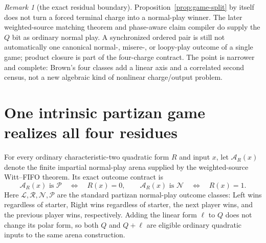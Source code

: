 \documentclass[11pt]{article}
\theoremstyle{definition}
\theoremstyle{remark}
\newtheorem{remark}[theorem]{Remark}
\begin{document}
\begin{remark}[the exact residual boundary]
Proposition~\ref{prop:game-split} by itself does not turn a forced
terminal charge into a normal-play winner.  The later weighted-source matching
theorem and phase-aware claim compiler do supply the $Q$ bit as ordinary normal
play.  A synchronized ordered pair is still not automatically one canonical
normal-, misere-, or loopy-play outcome of a single game; product closure is
part of the four-charge contract.  The point is narrower and complete:
Brown's four classes add a linear axis and a correlated second census, not a
new algebraic kind of nonlinear charge/output problem.
\end{remark}

\section{One intrinsic partizan game realizes all four residues}

For every ordinary characteristic-two quadratic form $R$ and input $x$, let
$\mathcal A_R(x)$ denote the finite impartial normal-play arena supplied by
the weighted-source Witt--FIFO theorem.  Its exact outcome contract is
\begin{equation}\label{eq:ordinary-arena}
 \mathcal A_R(x)\text{ is }\mathcal P
 \quad\Longleftrightarrow\quad R(x)=0,
 \qquad
 \mathcal A_R(x)\text{ is }\mathcal N
 \quad\Longleftrightarrow\quad R(x)=1.
\end{equation}
Here $\mathcal L,\mathcal R,\mathcal N,\mathcal P$ are the standard partizan
normal-play outcome classes: Left wins regardless of starter, Right wins
regardless of starter, the next player wins, and the previous player wins,
respectively.  Adding the linear form $\ell$ to $Q$ does not change its polar
form, so both $Q$ and $Q+\ell$ are eligible ordinary quadratic inputs to the
same arena construction.
\end{document}

